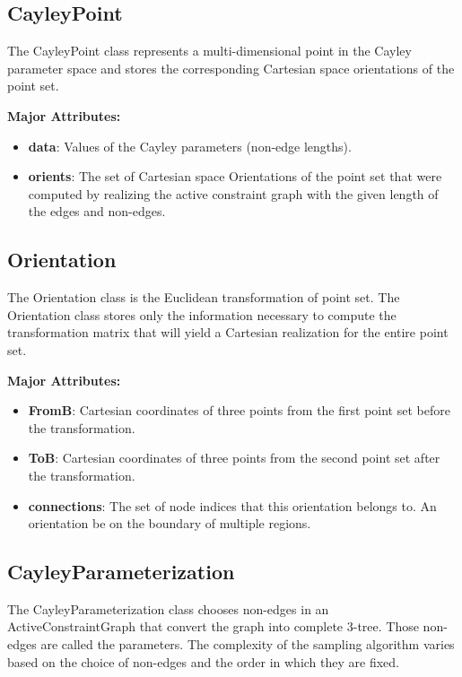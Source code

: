 \subsection{CayleyPoint} 
The CayleyPoint class represents a multi-dimensional point in the Cayley parameter space
and stores the corresponding Cartesian space orientations of the point set.

\noindent \textbf{Major Attributes:}
\begin{itemize}
		\item  \textbf{data}: Values of the Cayley parameters (non-edge
				lengths). \item  \textbf{orients}: The set of Cartesian space
				Orientations of the point set that were computed by
				realizing the active constraint graph with the given length of
				the edges and non-edges.
\end{itemize}

\subsection{Orientation} 
The Orientation class is the Euclidean transformation of point set. The
Orientation class stores only the information necessary to compute the
transformation matrix that will yield a Cartesian realization for the entire
point set.

\noindent \textbf{Major Attributes:} 
\begin{itemize}
		\item  \textbf{FromB}: Cartesian coordinates of three points from the
				first point set before the transformation.
		\item  \textbf{ToB}: Cartesian coordinates of three points from the
				second point set after the transformation.
		\item  \textbf{connections}: The set of node indices that this
				orientation belongs to. An orientation be on the
				boundary of multiple regions.
\end{itemize}


\subsection{CayleyParameterization} 
The CayleyParameterization class chooses non-edges in an ActiveConstraintGraph
that convert the graph into complete 3-tree. Those non-edges are called the
parameters. The complexity of the sampling algorithm varies based on the
choice of non-edges and the order in which they are fixed.

